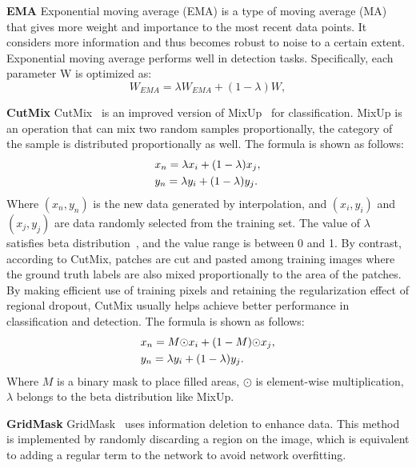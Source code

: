 \documentclass[10pt,twocolumn,letterpaper]{article}
\begin{document}
{\bf EMA} Exponential moving average (EMA) is a type of moving average (MA) that gives more weight and importance to the most recent data points. It considers more information and thus becomes robust to noise to a certain extent. Exponential moving average performs well in detection tasks. Specifically, each parameter W is optimized as:
    \begin{equation}
    \label{ema}
    W_{EMA} = \lambda W_{EMA} + (1 - \lambda) W,
    \end{equation}
    
{\bf CutMix} CutMix~\cite{yun2019cutmix} is an improved version of MixUp~\cite{zhang2017mixup} for classification. MixUp is an operation that can mix two random samples proportionally, the category of the sample is distributed proportionally as well. The formula is shown as follows:
    \begin{equation}
    \label{eq6}
    \begin{split}\small
    &x_n = {\lambda}x_i + (1 - \lambda) x_j,\\
    &y_n = {\lambda}y_i + (1 - \lambda) y_j.
    \end{split}
    \end{equation}
    Where $(x_n, y_n)$ is the new data generated by interpolation, and $(x_i, y_i)$ and $(x_j, y_j)$ are data randomly selected from the training set. The value of $\lambda$ satisfies beta distribution~\cite{gupta2004handbook}, and the value range is between 0 and 1. By contrast, according to CutMix, patches are cut and pasted among training images where the ground truth labels are also mixed proportionally to the area of the patches. By making efficient use of training pixels and retaining the regularization effect of regional dropout, CutMix usually helps achieve better performance in classification and detection. The formula is shown as follows:
    \begin{equation}
    \label{eq7}
    \begin{split}\small
    &x_n = M {\odot} x_i + (1 - M) {\odot} x_j,\\
    &y_n = {\lambda}y_i + (1 - \lambda)y_j.
    \end{split}
    \end{equation}
    Where ${M}$ is a binary mask to place filled areas, ${\odot}$ is element-wise multiplication, ${\lambda}$ belongs to the beta distribution like MixUp.

    {\bf GridMask} GridMask~\cite{chen2020gridmask} uses information deletion to enhance data. This method is implemented by randomly discarding a region on the image, which is equivalent to adding a regular term to the network to avoid network overfitting.
\end{document}

